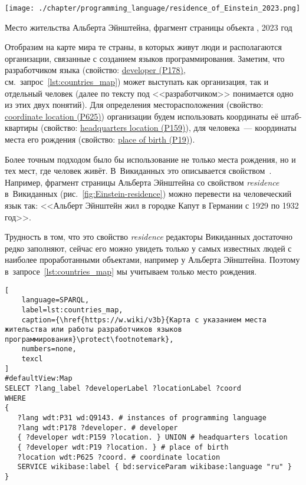 \begin{marginfigure}%
\centering
	\texttt{[image: ./chapter/programming\_language/residence\_of\_Einstein\_2023.png]}
	\caption[Место жительства Альберта Эйнштейна.]
    {Место жительства Альберта Эйнштейна, 
     фрагмент страницы объекта , 2023 год}
	\label{fig:Einstein-residence}
\end{marginfigure}
%
Отобразим на карте мира те страны, в которых живут люди и располагаются организации, 
связанные с созданием языков программирования. 
Заметим, что разработчиком языка 
(свойство: \href{https://www.wikidata.org/wiki/Property:P178}{developer (P178)}, 
см.~запрос~\ref{lst:countries_map}) может выступать как организация, 
так и отдельный человек 
(далее по тексту под <<разработчиком>> понимается одно из этих двух понятий). 
Для определения месторасположения 
(свойство: \href{https://www.wikidata.org/wiki/Property:P625}{coordinate location (P625)}) 
организации будем использовать координаты её штаб-квартиры 
(свойство: \href{https://www.wikidata.org/wiki/Property:P159}{headquarters location (P159)}), 
для человека~--- координаты места его рождения 
(свойство: \href{https://www.wikidata.org/wiki/Property:P19}{place of birth (P19)}). 

Более точным подходом было бы использование не только места рождения, но и тех мест, где человек живёт. 
В~Викиданных это описывается свойством~. 
%
Например, фрагмент страницы Альберта Эйнштейна  
со свойством \emph{residence} в~Викиданных (рис.~\ref{fig:Einstein-residence}) 
можно перевести на человеческий язык так: 
<<Альберт Эйнштейн жил в городке Капут в Германии с 1929 по 1932 год>>. 

Трудность в том, что это свойство \emph{residence} редакторы Викиданных достаточно редко заполняют, 
сейчас его можно увидеть только у самых известных людей с наиболее проработанными объектами, 
например у Альберта Эйнштейна. 
Поэтому в~запросе~\ref{lst:countries_map} мы учитываем только место рождения. 

\begin{lstlisting}[
	language=SPARQL,
	label=lst:countries_map,
	caption={\href{https://w.wiki/v3b}{Карта с указанием места жительства или работы разработчиков языков программирования}\protect\footnotemark},
    numbers=none,
	texcl
]
#defaultView:Map
SELECT ?lang_label ?developerLabel ?locationLabel ?coord
WHERE
{
   ?lang wdt:P31 wd:Q9143. # instances of programming language
   ?lang wdt:P178 ?developer. # developer
   { ?developer wdt:P159 ?location. } UNION # headquarters location
   { ?developer wdt:P19 ?location. } # place of birth
   ?location wdt:P625 ?coord. # coordinate location
   SERVICE wikibase:label { bd:serviceParam wikibase:language "ru" } 	
}
\end{lstlisting}


